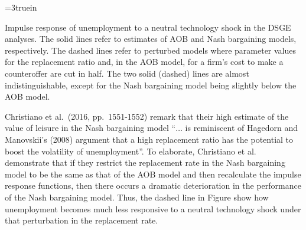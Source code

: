 \centerline{\epsfxsize=3truein}
\caption{Impulse response of unemployment to a neutral
technology shock in the DSGE analyses. The solid lines refer
to estimates of   AOB and Nash bargaining models,
respectively. The
dashed lines refer to perturbed models where parameter
values for the replacement ratio and,  in the AOB model,
for a firm's cost to make a counteroffer are cut in half. The
two solid (dashed) lines are almost indistinguishable, except for the Nash bargaining model being slightly below
the AOB model.}
\endfigure
%
%
%


 Christiano et al.\ (2016, pp.~1551-1552) remark that
   their high estimate of the value of leisure in the
Nash bargaining model ``$\ldots$  is reminiscent of Hagedorn
and Manovskii's (2008) argument that a high replacement ratio has
the potential to boost the volatility of unemployment''.
To elaborate, Christiano et al. demonstrate  that if they restrict the replacement
rate in the Nash bargaining model to be the same as that of the
AOB model and then recalculate the impulse response functions, then there occurs
a dramatic deterioration in the performance of the Nash
bargaining model. Thus,  the dashed line in Figure 
show how  unemployment becomes much less responsive to
a neutral technology shock under that perturbation in the replacement rate.

